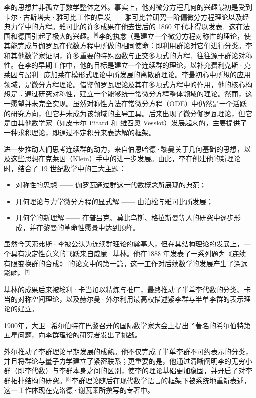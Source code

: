 李的思想并非孤立于数学整体之外。事实上，他对微分方程几何的兴趣最初是受到卡尔·古斯塔夫·雅可比工作的启发——雅可比曾研究一阶偏微分方程理论以及经典力学中的方程。雅可比的许多成果在他去世后的 1860 年代才得以发表，这在法国和德国引起了极大的兴趣。\(^\text{[6]}\)李的执念（是建立一个微分方程对称性的理论，使其能完成与伽罗瓦在代数方程中所做的相同使命：即利用群论对它们进行分类。李和其他数学家证明，许多重要的特殊函数与正交多项式的方程，往往源于群论对称性。在李的早期工作中，他的目标是建立一个连续群的理论，以补充费利克斯·克莱因与昂利·庞加莱在模形式理论中所发展的离散群理论。李最初心中所想的应用领域，是微分方程理论。借鉴伽罗瓦理论及其在多项式方程中的作用，他的核心构想是：通过研究对称性，建立一个能够统一常微分方程整体领域的理论。然而，这一愿望并未完全实现。虽然对称性方法在常微分方程（ODE）中仍然是一个活跃的研究方向，但它并未成为该领域的主导工具。后来出现了微分伽罗瓦理论，但它是由其他数学家（如皮卡尔 Picard 和 维西奥 Vessiot）发展起来的，主要提供了一种求积理论，即通过不定积分来表达解的框架。

进一步推动人们思考连续群的动力，来自伯恩哈德·黎曼关于几何基础的思想，以及这些思想在克莱因（Klein）手中的进一步发展。由此，李在创建他的新理论时，结合了 19 世纪数学中的三大主题：

\begin{itemize}
\item 对称性的思想 —— 伽罗瓦通过群这一代数概念所展现的典范；
\item 几何理论与力学微分方程的显式解 —— 由泊松与雅可比所发展；
\item 几何学的新理解 —— 在普吕克、莫比乌斯、格拉斯曼等人的研究中逐步形成，并在黎曼的革命性愿景中达到顶峰。
\end{itemize}
虽然今天索弗斯·李被公认为连续群理论的奠基人，但在其结构理论的发展上，一个具有决定性意义的飞跃来自威廉·基林。他在1888 年发表了一系列题为《连续有限变换群的合成》 的论文中的第一篇，这一工作对后续数学的发展产生了深远影响。\(^\text{[7]}\)

基林的成果后来被埃利·卡当加以精炼与推广，最终推动了半单李代数的分类、卡当的对称空间理论，以及赫尔曼·外尔利用最高权描述紧李群与半单李群的表示理论的建立。

1900年，大卫·希尔伯特在巴黎召开的国际数学家大会上提出了著名的希尔伯特第五星问题，向李群理论的研究者发出了挑战。

外尔推动了李群理论早期发展的成熟。他不仅完成了半单李群不可约表示的分类，并且将群论与量子力学建立了紧密联系；更重要的是，他通过清晰阐明李的无穷小群（即李代数）与李群本身之间的区别，使李的理论基础更加稳固，并开启了对李群拓扑结构的研究。\(^\text{[8]}\)李群理论随后在现代数学语言的框架下被系统地重新表述，这一工作体现在克洛德·谢瓦莱所撰写的专著中。
